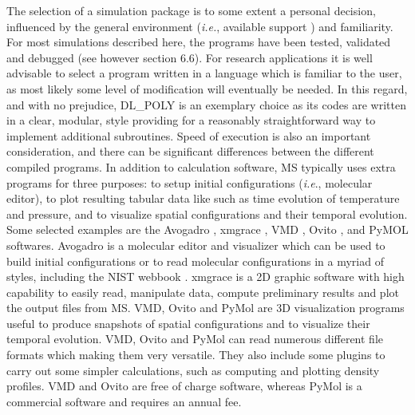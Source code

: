 \documentclass[9pt,bestpractices]{livecoms}
\begin{document}
The selection of a simulation package is to some extent a personal decision,
influenced by the general environment (\textit{i.e.}, available support ) and
familiarity. For most simulations described here, the programs have been
tested, validated and debugged (see however section 6.6). For research
applications it is well advisable to select a program written in a language
which is familiar to the user, as most likely some level of modification will eventually
be needed. In this regard, and with no prejudice, DL\_POLY is an exemplary
choice as its codes are written in a clear, modular, style providing for
a reasonably straightforward way to implement additional subroutines. Speed of
execution is also an important consideration, and there can be significant
differences between the different compiled programs. In addition to calculation
software, MS typically uses extra programs for three purposes: to setup initial configurations
(\textit{i.e}., molecular editor), to plot resulting tabular data like such as 
time evolution of temperature and pressure, and to visualize 
spatial configurations and their temporal evolution. Some selected examples are
the Avogadro \citep{avogadro}, xmgrace \citep{xmgrace},
VMD \citep{VMD}, Ovito \citep{ovito}, and PyMOL \citep{pymol} softwares.
Avogadro is a molecular editor and visualizer which can
be used to build initial configurations or to read molecular configurations in
a myriad of styles, including the NIST webbook \citep{lemmon2013}. xmgrace is a 2D graphic software with high capability to
easily read, manipulate data, compute preliminary results and plot the output
files from MS. VMD, Ovito and PyMol are 3D visualization programs useful to
produce snapshots of spatial configurations and to visualize their temporal
evolution. VMD, Ovito and PyMol can read numerous different file formats which
making them very versatile. They also include some plugins to
carry out some simpler calculations, such as computing and plotting density profiles. VMD and Ovito
are free of charge software, whereas PyMol is a commercial software and
requires an annual fee.
\end{document}
